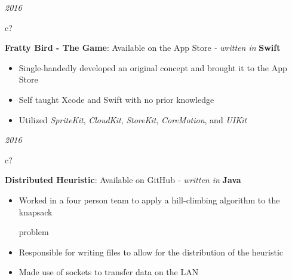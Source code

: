 \documentclass[12pt,a4paper,sans]{moderncv} %
\begin{document}
\hspace{11 mm}
\textit{2016}
\hspace{2 mm}
\begin{tabular}{c?}
 \\
\end{tabular}
 \hspace{2 mm}
 \textbf{Fratty Bird - The Game}: Available on the App Store %
 \textit{- written in} \textbf{Swift}
 
 \vspace{-1 mm}
 \begin{itemize}
 \addtolength{\itemindent}{31.7 mm}
 \item{Single-handedly developed an original concept and brought it to the App Store}
 \item{Self taught Xcode and Swift with no prior knowledge}
 \item{Utilized \textit{SpriteKit}, \textit{CloudKit}, \textit{StoreKit}, \textit{CoreMotion}, and \textit{UIKit}}
 \end{itemize}

\hspace{11 mm}
\textit{2016}
\hspace{2 mm}
\begin{tabular}{c?}
 \\
\end{tabular}
 \hspace{2 mm}
 \textbf{Distributed Heuristic}: Available on GitHub
 \textit{- written in} \textbf{Java}
 
 \vspace{-1 mm}
 \begin{itemize}
 \addtolength{\itemindent}{31.7 mm}
 \item{Worked in a four person team to apply a hill-climbing algorithm to the knapsack  
 
 \hspace{30.5 mm} problem }
 
 
 \item{Responsible for writing files to allow for the distribution of the heuristic }
 
 
 \item{Made use of sockets to transfer data on the LAN}
 \end{itemize}
 
\end{document}
